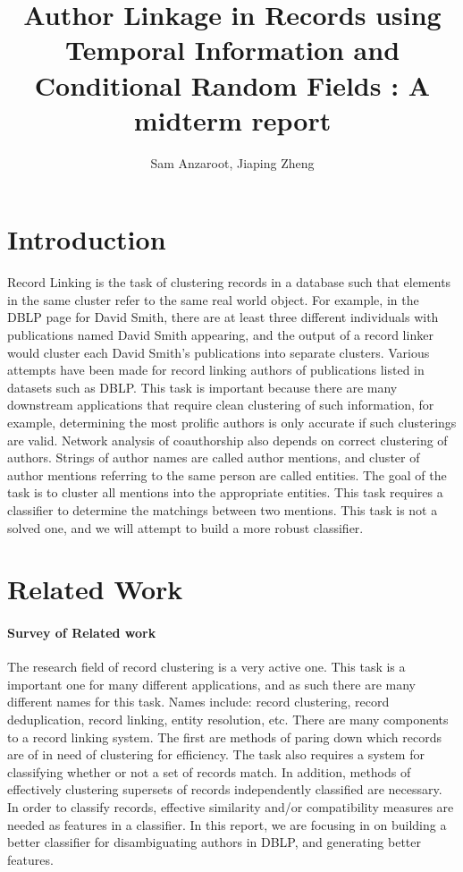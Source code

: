 \documentclass[twocolumn,letterpaper]{article}
\title{Author Linkage in Records using Temporal Information and Conditional Random Fields : A midterm report}
\author{Sam Anzaroot, Jiaping Zheng}
\date{}
\begin{document}
\ifpdf
{}
\else
{}
\fi

\maketitle

\section{Introduction} %
\label{sec:introduction}
Record Linking is the task of clustering records in a database such that elements in the same cluster refer to the same real world object. For example, in the DBLP page for David Smith, there are at least three different individuals with publications named David Smith appearing, and the output of a record linker would cluster each David Smith's publications into separate clusters. Various attempts have been made for record linking authors of publications listed in datasets such as DBLP. This task is important because there are many downstream applications that require clean clustering of such information, for example, determining the most prolific authors is only accurate if such clusterings are valid. Network analysis of coauthorship also depends on correct clustering of authors. Strings of author names are called author mentions, and cluster of author mentions referring to the same person are called entities. The goal of the task is to cluster all mentions into the appropriate entities. This task requires a classifier to determine the matchings between two mentions. This task is not a solved one, and we will attempt to build a more robust classifier.

\section{Related Work} %
\label{sec:related_work}
\paragraph{Survey of Related work} %
\label{par:survey_of_related_work}
The research field of record clustering is a very active one. This task is a important one for many different applications, and as such there are many different names for this task. Names include: record clustering, record deduplication, record linking, entity resolution, etc. There are many components to a record linking system. The first are methods of paring down which records are of in need of clustering for efficiency. The task also requires a system for classifying whether or not a set of records match. In addition, methods of effectively clustering supersets of records independently classified are necessary. In order to classify records, effective similarity and/or compatibility measures are needed as features in a classifier. In this report, we are focusing in on building a better classifier for disambiguating authors in DBLP, and generating better features. 
\end{document}
